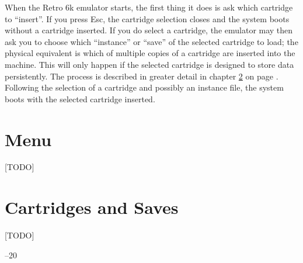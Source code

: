 \documentclass[12pt]{{memoir}}
\begin{document}
When the Retro 6k emulator starts, the first thing it does is ask which cartridge to ``insert''. If you press \textsf{Esc}, the cartridge selection closes and the system boots without a cartridge inserted. If you do select a cartridge, the emulator may then ask you to choose which ``instance'' or ``save'' of the selected cartridge to load; the physical equivalent is which of multiple copies of a cartridge are inserted into the machine. This will only happen if the selected cartridge is designed to store data persistently. The process is described in greater detail in chapter \ref{ch:cartridges} on page \pageref{ch:cartridges}. Following the selection of a cartridge and possibly an instance file, the system boots with the selected cartridge inserted.

\chapter{Menu}

[TODO]

\chapter{Cartridges and Saves}
\label{ch:cartridges}

[TODO]

\cleartoverso
\pagestyle{empty}

\noindent\thetitle\hfill{}--20 \theauthor
\end{document}
